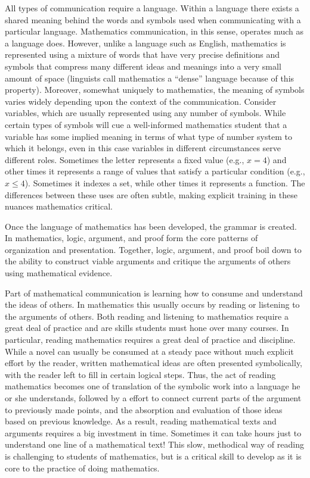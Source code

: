 \documentclass[
]{book}
\theoremstyle{definition}
\theoremstyle{definition}
\theoremstyle{definition}
\theoremstyle{remark}
\begin{document}
All types of communication require a language. Within a language there exists a shared meaning behind the words and symbols used when communicating with a particular language. Mathematics communication, in this sense, operates much as a language does. However, unlike a language such as English, mathematics is represented using a mixture of words that have very precise definitions and symbols that compress many different ideas and meanings into a very small amount of space (linguists call mathematics a ``dense'' language because of this property). Moreover, somewhat uniquely to mathematics, the meaning of symbols varies widely depending upon the context of the communication. Consider variables, which are usually represented using any number of symbols. While certain types of symbols will cue a well-informed mathematics student that a variable has some implied meaning in terms of what type of number system to which it belongs, even in this case variables in different circumstances serve different roles. Sometimes the letter represents a fixed value (e.g., \(x=4\)) and other times it represents a range of values that satisfy a particular condition (e.g., \(x\leq 4\)). Sometimes it indexes a set, while other times it represents a function. The differences between these uses are often subtle, making explicit training in these nuances mathematics critical.

Once the language of mathematics has been developed, the grammar is created. In mathematics, logic, argument, and proof form the core patterns of organization and presentation. Together, logic, argument, and proof boil down to the ability to construct viable arguments and critique the arguments of others using mathematical evidence.

Part of mathematical communication is learning how to consume and understand the ideas of others. In mathematics this usually occurs by reading or listening to the arguments of others. Both reading and listening to mathematics require a great deal of practice and are skills students must hone over many courses. In particular, reading mathematics requires a great deal of practice and discipline. While a novel can usually be consumed at a steady pace without much explicit effort by the reader, written mathematical ideas are often presented symbolically, with the reader left to fill in certain logical steps. Thus, the act of reading mathematics becomes one of translation of the symbolic work into a language he or she understands, followed by a effort to connect current parts of the argument to previously made points, and the absorption and evaluation of those ideas based on previous knowledge. As a result, reading mathematical texts and arguments requires a big investment in time. Sometimes it can take hours just to understand one line of a mathematical text! This slow, methodical way of reading is challenging to students of mathematics, but is a critical skill to develop as it is core to the practice of doing mathematics.
\end{document}
